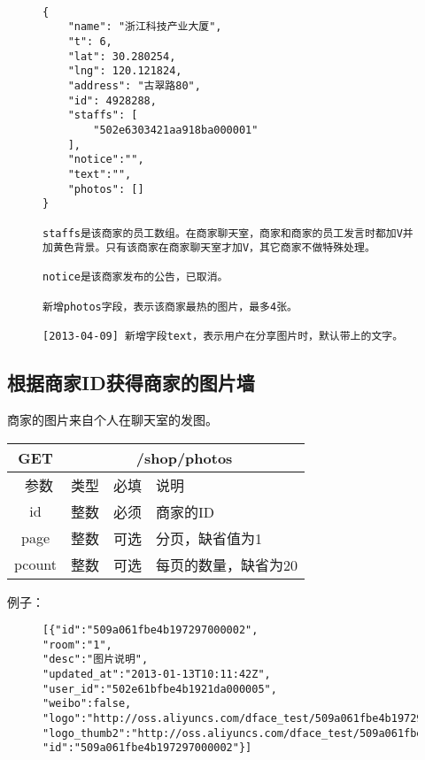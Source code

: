 \documentclass[cs4size]{ctexartutf8}
\begin{document}
\begin{figure}[H]
\begin{verbatim}

{
    "name": "浙江科技产业大厦",
    "t": 6,
    "lat": 30.280254,
    "lng": 120.121824,
    "address": "古翠路80",
    "id": 4928288,
    "staffs": [
        "502e6303421aa918ba000001"
    ],
    "notice":"",
    "text":"",    
    "photos": []
}

staffs是该商家的员工数组。在商家聊天室，商家和商家的员工发言时都加V并加黄色背景。只有该商家在商家聊天室才加V，其它商家不做特殊处理。

notice是该商家发布的公告，已取消。

新增photos字段，表示该商家最热的图片，最多4张。

[2013-04-09] 新增字段text，表示用户在分享图片时，默认带上的文字。

\end{verbatim}
\end{figure}



\subsection{根据商家ID获得商家的图片墙}
商家的图片来自个人在聊天室的发图。\label{photowall}

\begin{table}[H]
   \begin{center}
\begin{tabular}{|c|c|c|p{12cm}|}
\hline
GET & \multicolumn{3}{|c|}{/shop/photos} \\
\hline\hline
 \  参数  & 类型 & 必填 &  说明  \\
\hline
 id  & 整数 & 必须 & 商家的ID\\
   \hline
 page  & 整数 & 可选 & 分页，缺省值为1\\ 
 \hline
 pcount  & 整数 & 可选 & 每页的数量，缺省为20\\ 
\hline
\end{tabular}
   \end{center}
\end{table}

例子：

\begin{figure}[H]
\begin{verbatim}
[{"id":"509a061fbe4b197297000002",
"room":"1",
"desc":"图片说明",  
"updated_at":"2013-01-13T10:11:42Z",
"user_id":"502e61bfbe4b1921da000005",
"weibo":false,
"logo":"http://oss.aliyuncs.com/dface_test/509a061fbe4b197297000002/0.jpg",
"logo_thumb2":"http://oss.aliyuncs.com/dface_test/509a061fbe4b197297000002/t2_0.jpg",
"id":"509a061fbe4b197297000002"}]

\end{verbatim}
\end{figure}
\end{document}
